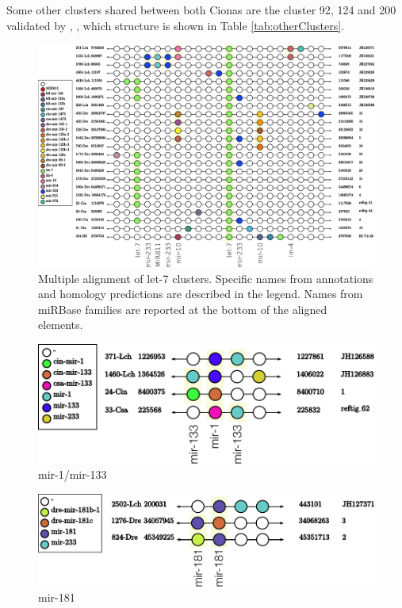 \documentclass[graybox]{svmult}
\begin{document}
Some other clusters shared between both Cionas are the cluster 92, 124 and 200  
validated by \cite{Norden-Krichmar2007}, \cite{Fu:08}, \cite{Hendrix2010} 
which structure is shown in Table \ref{tab:otherClusters}.    


\begin{figure}[ht!]
\sidecaption[t]
\includegraphics[width=\textwidth]{./Images/Cluster_images/let-7_101_128}
\caption{Multiple alignment of let-7 clusters. Specific names from annotations 
and homology predictions are described in the legend. Names from miRBase 
families are reported at the bottom of the aligned elements.} 
\label{fig:let-7}
\end{figure}

\begin{figure}[ht!]
\sidecaption[t]
\includegraphics[width=\textwidth]{./Images/Cluster_images/mir-133_113_33}
\caption{mir-1/mir-133}
\label{fig:mir-1}
\end{figure}

\begin{figure}[ht!]
\sidecaption[t]
\includegraphics[width=\textwidth]{./Images/Cluster_images/mir-181_105_2502}
\caption{mir-181}
\label{fig:mir-181}
\end{figure}
\end{document}
